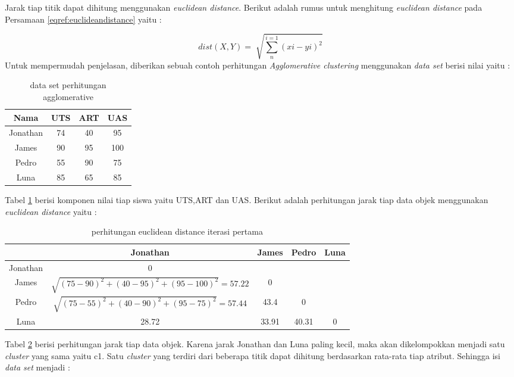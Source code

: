 \documentclass[a4paper,twoside]{article}
\begin{document}
\begin{enumerate}
Jarak tiap titik dapat dihitung menggunakan \textit{euclidean distance}. Berikut adalah rumus untuk menghitung \textit{euclidean distance} pada Persamaan \ref{eqref:euclideandistance} yaitu : 

\begin{equation}
	dist(X,Y) = \sqrt[]{\sum_{n}^{i=1}(xi-yi)^2}
	\label{eqref:euclideandistance}
\end{equation}
\pagebreak
Untuk mempermudah penjelasan, diberikan sebuah contoh perhitungan \textit{Agglomerative clustering} menggunakan \textit{data set} berisi nilai yaitu : 

\begin{table}[ht]
\centering
\begin{tabular}{|c|c|c|c|}
\hline 
Nama & UTS & ART & UAS \\ 
\hline 
Jonathan & 74 & 40 & 95 \\ 
\hline 
James & 90 & 95 & 100 \\ 
\hline 
Pedro & 55 & 90 & 75 \\ 
\hline 
Luna & 85 & 65 & 85 \\ 
\hline 
\end{tabular} 
\caption{data set perhitungan agglomerative}
\label{tab:datasetagglomerative}
\end{table} 
Tabel \ref{tab:datasetagglomerative} berisi komponen nilai tiap siswa yaitu UTS,ART dan UAS. Berikut adalah perhitungan jarak tiap data objek menggunakan \textit{euclidean distance}  yaitu : 

\begin{table}[ht]
\centering
\begin{tabular}{|c|c|c|c|c|}
\hline 
& Jonathan & James & Pedro & Luna \\ 
\hline 
Jonathan & 0 &  &  &  \\ 
\hline 
James & $\sqrt{(75-90)^2 + (40-95)^2 + (95-100)^2} = 57.22$ & 0 &  &  \\ 
\hline 
Pedro & $\sqrt{(75-55)^2 + (40-90)^2 + (95-75)^2} = 57.44$ &  43.4 & 0 &  \\ 
\hline 
Luna & \cellcolor{yellow!25}  28.72 &  33.91 & 40.31 & 0 \\ 
\hline 
\end{tabular} 
\caption{perhitungan euclidean distance iterasi pertama}
\label{tab:agglomerativeiterasi1}
\end{table}

Tabel \ref{tab:agglomerativeiterasi1} berisi perhitungan jarak tiap data objek. Karena jarak Jonathan dan Luna paling kecil, maka akan dikelompokkan menjadi satu \textit{cluster} yang sama yaitu c1. Satu \textit{cluster} yang terdiri dari beberapa titik dapat dihitung berdasarkan rata-rata tiap atribut. Sehingga isi \textit{data set} menjadi : 




\end{enumerate}
\end{document}
